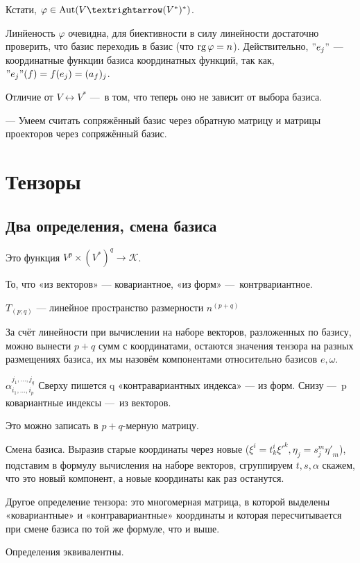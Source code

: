 \documentclass[12pt, a4paper]{article}
\begin{document}
Кстати, $\varphi \in \Aut (V → (V^*)^*)$.

Линйеность $\varphi$ очевидна, для биективности в силу линейности 
достаточно проверить, что базис переходиь в базис (что $\operatorname{rg} \varphi = n$).
Действительно, $"e_j"$ — координатные функции базиса координатных функций, 
так как, $"e_j"(f) = f(e_j) = (a_f)_j$.

Отличие от $V \leftrightarrow V^*$ — в том, что теперь оно не зависит от выбора базиса.

— Умеем считать сопряжённый базис через обратную матрицу 
и матрицы проекторов через сопряжённый базис.



\section{Тензоры}

\subsection{Два определения, смена базиса}

Это функция $V^p × (V^*)^q → \mathcal{K}$.

То, что «из векторов» — ковариантное, «из форм» — контрвариантное.

$T_{(p; q)}$ — линейное пространство размерности $n^(p + q)$

За счёт линейности при вычислении на наборе векторов, разложенных по базису,
можно вынести $p + q$ сумм с координатами, остаются значения тензора 
на разных размещениях базиса, их мы назовём компонентами относительно базисов $e, \omega$.

$\alpha^{j_1, …, j_q}_{i_1, …, i_p}$
Сверху пишется q «контравариантных индекса» — из форм.
Снизу — p ковариантные индексы — из векторов.

Это можно записать в $p + q$-мерную матрицу.

Смена базиса. Выразив старые координаты через новые 
($\xi^i = t^i_k {\xi'}^k, \eta_j = s^m_j {\eta'}_m$), 
подставим в формулу вычисления на наборе векторов, 
сгруппируем $t, s, \alpha$ скажем, что это новый компонент, 
а новые координаты как раз останутся.

Другое определение тензора: это многомерная матрица, 
в которой выделены «ковариантные» и «контравариантные» координаты 
и которая пересчитывается при смене базиса по той же формуле, что и выше.

Определения эквивалентны.
\end{document}
